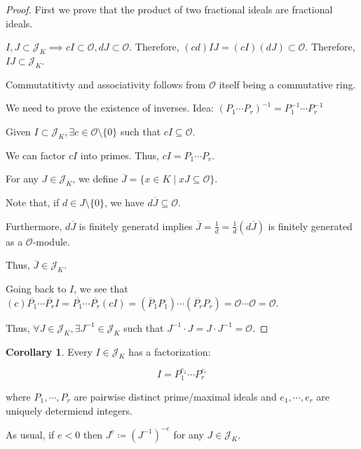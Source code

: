 \documentclass[openany]{amsbook}
\numberwithin{section}{chapter}
\theoremstyle{definition}
\newtheorem{corollary}[theorem]{Corollary}
\begin{document}
\begin{proof}
    First we prove that the product of two fractional ideals are fractional ideals.

    \(I, J \subset \mathcal{J}_K \implies cI \subset \mathcal{O}, dJ \subset \mathcal{O}\). Therefore, \((cd)IJ = (cI)(dJ) \subset \mathcal{O}\). Therefore, \(IJ \subset \mathcal{J}_K\).

    Commutatitivty and associativity follows from \(\mathcal{O}\) itself being a commutative ring.

    We need to prove the existence of inverses. Idea: \((P_1 \cdots P_r) ^{-1} = P_1 ^{-1} \cdots P_r ^{-1}\) 

    Given \(I \subset \mathcal{J}_K, \exists c \in \mathcal{O} \setminus \{ 0 \} \) such that \(cI \subseteq \mathcal{O} \).

    We can factor \(cI\) into primes. Thus, \(cI = P_1 \cdots P_r\).

    For any \(J \in \mathcal{J}_K\), we define \(\overline{J} = \{ x \in K \mid xJ \subseteq \mathcal{O} \} \).

    Note that, if \(d\in J \setminus \{ 0 \}\), we have \(d \overline{J} \subseteq \mathcal{O}\).

    Furthermore, \(d \overline{J} \) is finitely generatd implies \(\overline{J} = \frac{1}{d} = \frac{1}{d}(d \overline{J})\) is finitely generated as a \(\mathcal{O}\)-module. 
    
    Thus, \(\overline{J} \in \mathcal{J}_K\).

    Going back to \(I\), we see that \((c) \overline{P_1} \cdots \overline{P_r} I = \overline{P_1} \cdots \overline{P_r} (cI) = (\overline{P}_1 P_1) \cdots (\overline{P_r} P_r) = \mathcal{O} \cdots \mathcal{O} = \mathcal{O}\).  

    Thus, \(\forall J \in \mathcal{J}_K, \exists J ^{-1} \in \mathcal{J}_K\) such that \(J ^{-1} \cdot J = J \cdot J ^{-1} = \mathcal{O}\).

\end{proof}

\begin{corollary}
    Every \(I \in \mathcal{J}_K\) has a factorization:

    \[
        I = P_1 ^ {e_1} \cdots P_r^{e_r}
    \]

    where \(P_1, \cdots , P_r\) are pairwise distinct prime/maximal ideals and \(e_1, \cdots , e_r\) are uniquely determiend integers.

    As usual, if \(e < 0\) then \(J^e \coloneqq (J ^{-1} )^{-e}\) for any \(J \in \mathcal{J}_K\).

\end{corollary}
\end{document}
